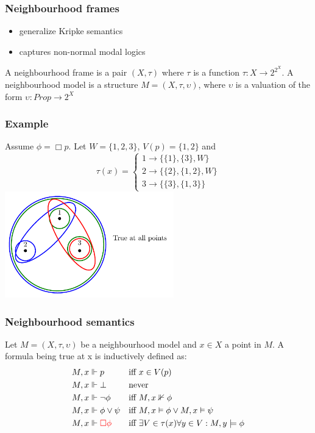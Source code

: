 \documentclass[hyperref={pdfpagelabels=false},t,10pt]{beamer}
\begin{document}
\begin{frame}
  \frametitle{Neighbourhood frames}
    \begin{itemize}
      \item generalize Kripke semantics
      \item captures non-normal modal logics
    \end{itemize}

    \pause
    \begin{definition}
      A neighbourhood frame is a pair $(X, \tau)$ where $\tau$ is a function $\tau : X \rightarrow 2^{2^X}$. \newline
      A neighbourhood model is a structure $M = (X, \tau, \upsilon)$, where $\upsilon$ is a valuation of the form $\upsilon : Prop \rightarrow 2^X$
    \end{definition}
\end{frame}

\begin{frame}
  \frametitle{Example}
      Assume $\phi = \Box p$. Let $W = \{1,2,3\}$, $V(p) = \{1,2\}$ and 
    \[
            \tau(x) = 
            \begin{cases}
                1 \rightarrow \{\{1\}, \{3\}, W\} \\
                2 \rightarrow \{\{2\}, \{1,2\}, W\} \\
                3 \rightarrow \{\{3\}, \{1,3\}\}
            \end{cases}
    \] 
    \centering
      \includegraphics[width=0.55\textwidth]{Example3.pdf}
\end{frame}

\begin{frame}
  \frametitle{Neighbourhood semantics}
  \begin{definition}
  Let $M = (X,\tau,\upsilon)$ be a neighbourhood model and $x \in X$ a point in $M$. A formula being true at x is inductively defined as:
      \begin{align*}
        M,x &\Vdash p &&\text{iff } x \in V(p)\\
        M,x &\Vdash \bot &&\text{never } \\
        M,x &\Vdash \neg \phi &&\text{iff } M,x \nVdash \phi\\
        M,x &\Vdash \phi \lor \psi &&\text{iff } M,x \vDash \phi \lor M,x \vDash \psi\\
        M,x &\Vdash \textcolor{red}{\Box \phi} &&\text{iff } \exists V \in \tau(x) \forall y \in V : M,y \models \phi
    \end{align*}
  \end{definition}
\end{frame}
\end{document}
